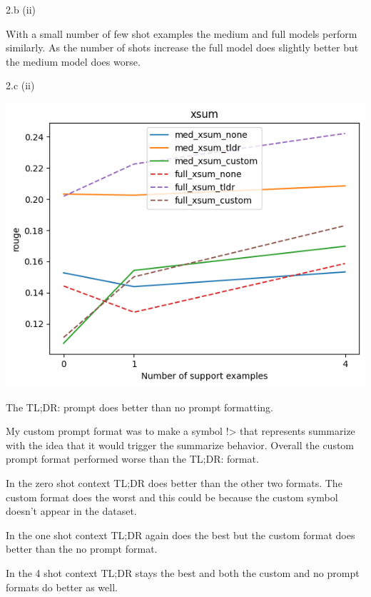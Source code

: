 \clearpage

\LARGE
2.b (ii)
\normalsize

\begin{answer}
    With a small number of few shot examples the medium and full models perform similarly. As the number of shots increase the full model does slightly better but the medium model does worse.
\end{answer}

\LARGE
2.c (ii)
\normalsize

\begin{answer}
    \begin{center}
        \includegraphics*[width=1.0\textwidth]{q2_xsum_plot}
    \end{center}
    The TL;DR: prompt does better than no prompt formatting.

    My custom prompt format was to make a symbol !> that represents summarize with the idea that it would trigger the summarize behavior. 
    Overall the custom prompt format performed worse than the TL;DR: format.  

    In the zero shot context TL;DR does better than the other two formats. 
    The custom format does the worst and this could be because the custom symbol doesn't appear in the dataset.

    In the one shot context TL;DR again does the best but the custom format does better than the no prompt format.

    In the 4 shot context TL;DR stays the best and both the custom and no prompt formats do better as well. 
\end{answer}

